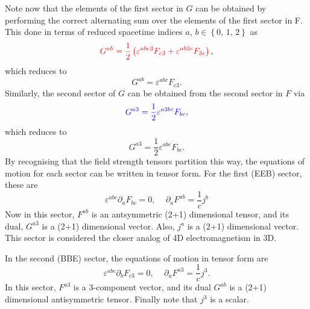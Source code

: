 \documentclass{article}
\begin{document}
Note now that the elements of the first sector in $G$ can be obtained by performing the correct alternating sum over the elements of the first sector in F. This done in terms of reduced spacetime indices $a,\,b\in \left\{0,\,1,\,2\right\}$ as
\begin{equation}
    \color{red}G^{ab} = \frac{1}{2}\left(\varepsilon^{abc3}F_{c3} + \varepsilon^{ab3c}F_{3c}\right)\color{black},
\end{equation}
which reduces to 
\begin{equation}
    G^{ab} = \varepsilon^{abc}F_{c3}.
\end{equation}
Similarly, the second sector of $G$ can be obtained from the second sector in $F$ via
\begin{equation}
    \color{blue}G^{a3} = \frac{1}{2}\varepsilon^{a3bc}F_{bc}\color{black},
\end{equation}
which reduces to
\begin{equation}
    G^{a3} = \frac{1}{2}\varepsilon^{abc}F_{bc}.
\end{equation}
By recognising that the field strength tensors partition this way, the equations of motion for each sector can be written in tensor form. For the first (EEB) sector, these are
\begin{equation}
    \boxed{
    \varepsilon^{abc}\partial_{a}F_{bc}=0,\,\quad \partial_{a}F^{ab} = \frac{1}{c}j^{b}
    }
\end{equation}
Now in this sector, $F^{ab}$ is an antsymmetric (2+1) dimensional tensor, and its dual, $G^{a3}$ is a (2+1) dimensional vector. Also, $j^{a}$ is a (2+1) dimensional vector. This sector is considered the closer analog of 4D electromagnetism in 3D. \newline

\noindent In the second (BBE) sector, the equations of motion in tensor form are
\begin{equation}
    \boxed{
    \varepsilon^{abc}\partial_{b}F_{c3}=0,\,\quad \partial_{a}F^{a3}= \frac{1}{c}j^{3}.
    }
\end{equation}
In this sector, $F^{a3}$ is a 3-component vector, and its dual $G^{ab}$ is a (2+1) dimensional antisymmetric tensor. Finally note that $j^{3}$ is a scalar.\newline
\end{document}
